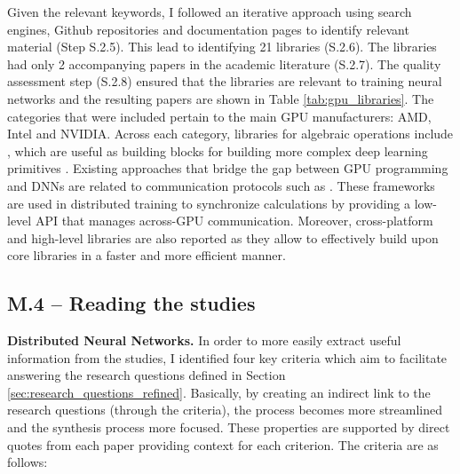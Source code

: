 Given the relevant keywords, I followed an iterative approach using search engines, Github
repositories and documentation pages to identify relevant material (Step S.2.5). This lead to
identifying 21 libraries (S.2.6). The libraries had only 2 accompanying papers
\cite{chetlur_cudnn_2014,okuta_cupy_2017} in the academic literature (S.2.7). The quality
assessment step (S.2.8) ensured that the libraries are relevant to training neural networks and the
resulting papers are shown in Table \ref{tab:gpu_libraries}. The categories that were included
pertain to the main GPU manufacturers: AMD, Intel and NVIDIA. Across each category, libraries for
algebraic operations include \cite{noauthor_cublas_nodate,noauthor_rocmrocblas_2025,
	noauthor_uxlfoundationonemath_2025}, which are useful as building blocks for building more complex
deep learning primitives
\cite{chetlur_cudnn_2014,noauthor_rocmmiopen_2025,onednn_contributors_oneapi_2025}. Existing
approaches that bridge the gap between GPU programming and DNNs are related to communication
protocols such as
\cite{noauthor_nvidianccl_2025,noauthor_rocmrccl_2025,noauthor_uxlfoundationoneccl_2025}. These
frameworks are used in distributed training to synchronize calculations by providing a low-level
API that manages across-GPU communication. Moreover, cross-platform and high-level libraries are
also reported as they allow to effectively build upon core libraries in a faster and more efficient
manner.

\subsection{M.4 -- Reading the studies}
\label{sec:reading-studies}
\textbf{Distributed Neural Networks.}
In order to more easily extract useful information from the studies, I identified four key criteria
which aim to facilitate answering the research questions defined in Section \ref{sec:research_questions_refined}.
Basically, by creating an indirect link to the research questions (through the criteria), the process becomes more streamlined
and the synthesis process more focused. These properties are supported by direct quotes from each paper
providing context for each criterion. The criteria are as follows:

